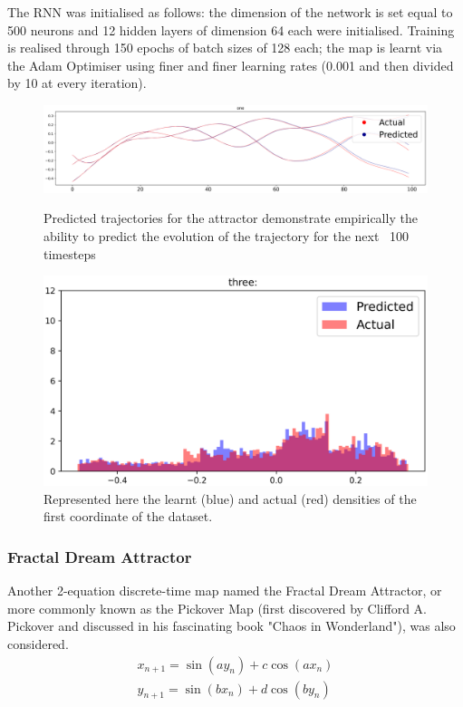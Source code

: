 \documentclass[a4paper,12pt,twoside]{report}
\begin{document}
The RNN was initialised as follows: the dimension of the network is set equal to 500 neurons and 12 hidden layers of dimension 64 each were initialised. Training is realised through 150 epochs of batch sizes of 128 each; the map is learnt via the Adam Optimiser using finer and finer learning rates (0.001 and then divided by 10 at every iteration).

\begin{figure}[ht]
  \centering
  \includegraphics[scale=0.35]{Thomas_1.eps}\caption*{Predicted trajectories for the attractor demonstrate empirically the ability to predict the evolution of the trajectory for the next ~100 timesteps}
  \includegraphics[scale=0.5]{Thomas_3.eps}\caption*{Represented here the learnt (blue) and actual (red) densities of the first coordinate of the dataset.}
\end{figure}


\subsubsection{Fractal Dream Attractor}

Another 2-equation discrete-time map named the Fractal Dream Attractor, or more commonly known as the Pickover Map (first discovered by Clifford A. Pickover and discussed in his fascinating book "Chaos in Wonderland"\cite{PickoverChaos}), was also considered.
\begin{eqnarray}\label{eqns_clifford}
  {x_{n+1}=\sin(ay_n) + c\cos(ax_n)} \\
  {y_{n+1}=\sin(bx_n)+d\cos(by_n)}
\end{eqnarray}
\end{document}
